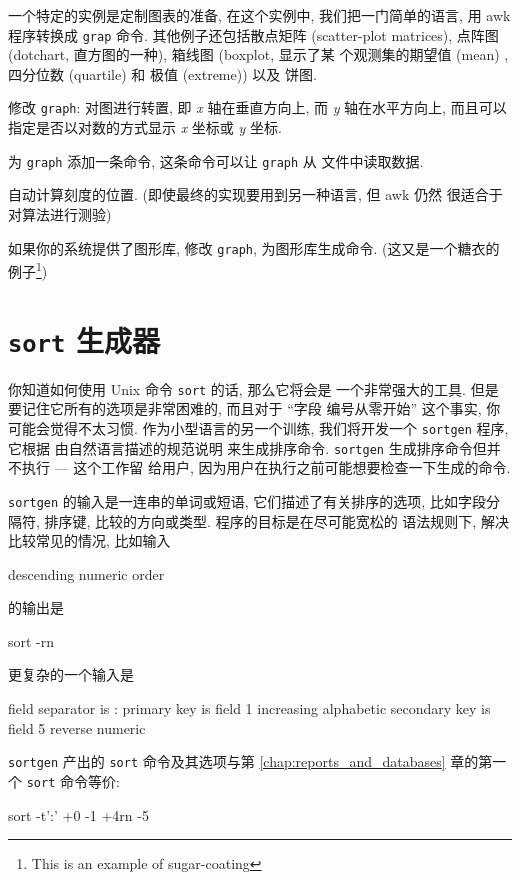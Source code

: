 一个特定的实例是定制图表的准备, 在这个实例中, 我们把一门简单的语言, 用
awk 程序转换成 \texttt{grap} 命令. 其他例子还包括散点矩阵 (scatter-plot
matrices), 点阵图 (dotchart, 直方图的一种), 箱线图 (boxplot, 显示了某
个观测集的期望值 (mean) , 四分位数 (quartile) 和 极值 (extreme)) 以及
饼图.

\begin{exercise}
    修改 \texttt{graph}: 对图进行转置, 即 \textit{x} 轴在垂直方向上,
    而 \textit{y} 轴在水平方向上, 而且可以指定是否以对数的方式显示
    \textit{x} 坐标或 \textit{y} 坐标.
\end{exercise}

\begin{exercise}
    为 \texttt{graph} 添加一条命令, 这条命令可以让 \texttt{graph} 从
    文件中读取数据.
\end{exercise}

\begin{exercise}
    自动计算刻度的位置. (即使最终的实现要用到另一种语言, 但 awk 仍然
    很适合于对算法进行测验)
\end{exercise}

\begin{exercise}
    如果你的系统提供了图形库, 修改 \texttt{graph}, 为图形库生成命令.
    (这又是一个糖衣的例子\footnote{This is an example of sugar-coating})
\end{exercise}

\section{\textbf{\texttt{sort}} 生成器}
\label{sec:a_sort_generator}

 你知道如何使用 Unix 命令 \texttt{sort} 的话, 那么它将会是
一个非常强大的工具. 但是要记住它所有的选项是非常困难的, 而且对于 ``字段
编号从零开始'' 这个事实, 你可能会觉得不太习惯. 作为小型语言的另一个训练,
我们将开发一个 \texttt{sortgen} 程序, 它根据 由自然语言描述的规范说明
来生成排序命令. \texttt{sortgen} 生成排序命令但并不执行 --- 这个工作留
给用户, 因为用户在执行之前可能想要检查一下生成的命令.

\texttt{sortgen} 的输入是一连串的单词或短语, 它们描述了有关排序的选项,
比如字段分隔符, 排序键, 比较的方向或类型. 程序的目标是在尽可能宽松的
语法规则下, 解决比较常见的情况, 比如输入
\begin{file}
    descending numeric order
\end{file}
的输出是
\begin{shell}
    sort -rn
\end{shell}
更复杂的一个输入是
\begin{file}
    field separator is :
    primary key is field 1
        increasing alphabetic
    secondary key is field 5
        reverse numeric
\end{file}
\texttt{sortgen} 产出的 \texttt{sort} 命令及其选项与第
\ref{chap:reports_and_databases} 章的第一个 \texttt{sort} 命令等价:
\begin{shell}
    sort -t':' +0 -1 +4rn -5
\end{shell}

